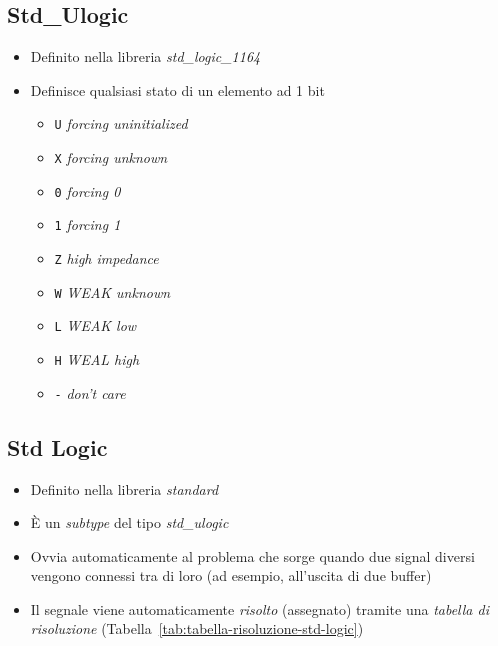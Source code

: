 \documentclass{article}
\begin{document}
\subsection{Std\_Ulogic}
\begin{itemize}
  \item Definito nella libreria \textit{std\_logic\_1164}
  \item Definisce qualsiasi stato di un elemento ad 1 bit
        \begin{itemize}
          \item \texttt{U} \textit{forcing uninitialized}
          \item \texttt{X} \textit{forcing unknown}
          \item \texttt{0} \textit{forcing 0}
          \item \texttt{1} \textit{forcing 1}
          \item \texttt{Z} \textit{high impedance}
          \item \texttt{W} \textit{WEAK unknown}
          \item \texttt{L} \textit{WEAK low}
          \item \texttt{H} \textit{WEAL high}
          \item \texttt{-} \textit{don't care}
        \end{itemize}
\end{itemize}

\subsection{Std Logic}
\begin{itemize}
  \item Definito nella libreria \textit{standard}
  \item \`E un \textit{subtype} del tipo \textit{std\_ulogic}
  \item Ovvia automaticamente al problema che sorge quando due signal diversi vengono connessi tra di loro (ad esempio, all'uscita di due buffer)
  \item Il segnale viene automaticamente \textit{risolto} (assegnato) tramite una \textit{tabella di risoluzione} (Tabella~\ref{tab:tabella-risoluzione-std-logic})
\end{itemize}
\end{document}
